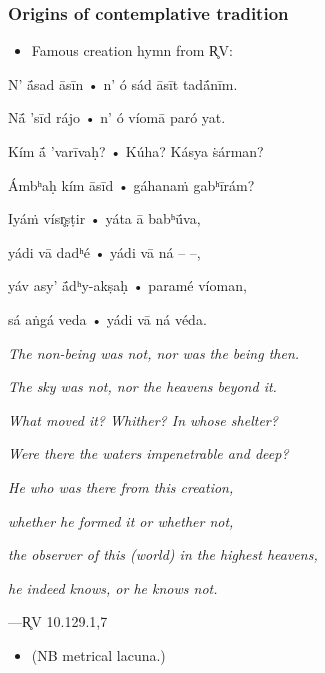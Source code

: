 \documentclass[pdf]{beamer}
\begin{document}
\begin{frame} \frametitle{Origins of contemplative tradition}
\begin{itemize}
	\item Famous creation hymn from R̥V:
\end{itemize}

\begin{center}
\begin{multicols}{2}
\scriptsize{
	N' ā́sad āsīn • n' ó sád āsīt tadā́nīm.

	Nā́ 'sīd rájo • n' ó víomā paró yat.

	Kím ā́ 'varīvaḥ? • Kúha? Kásya ṡárman?

	Ámbʰaḥ kím āsīd • gáhanaṁ gabʰīrám?

	\vspace{\baselineskip}

	Iyáṁ vísr̥ṣṭir • yáta ā babʰū́va,

	yádi vā dadʰé • yádi vā ná -- --,

	yáv asy' ā́dʰy-akṣaḥ • paramé víoman,

	sá aṅgá veda • yádi vā ná véda.

	\columnbreak

	\textit{The non-being was not, nor was the being then.}

	\textit{The sky was not, nor the heavens beyond it.}

	\textit{What moved it? Whither? In whose shelter?}

	\textit{Were there the waters impenetrable and deep?}

	\vspace{\baselineskip}

	\textit{He who was there from this creation,}

	\textit{whether he formed it or whether not,}

	\textit{the observer of this (world) in the highest heavens,}

	\textit{he indeed knows, or he knows not.}
}
\end{multicols}
 ---R̥V 10.129.1,7
\end{center}

\begin{itemize}
	\item (NB metrical lacuna.)
\end{itemize}
\end{frame}
\end{document}
